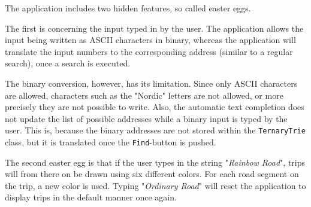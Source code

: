 The application includes two hidden features, so called easter eggs.

The first is concerning the input typed in by the user. The application allows the input being written as ASCII characters in binary, whereas the application will translate the input numbers to the corresponding address (similar to a regular search), once a search is executed.

The binary conversion, however, has its limitation. Since only ASCII characters are allowed, characters such as the "Nordic" letters are not allowed, or more precisely they are not possible to write. Also, the automatic text completion does not update the list of possible addresses while a binary input is typed by the user. This is, because the binary addresses are not stored within the \texttt{TernaryTrie} class, but it is translated once the \texttt{Find}-button is pushed.

The second easter egg is that if the user types in the string "\textit{Rainbow Road}", trips will from there on be drawn using six different colors. For each road segment on the trip, a new color is used. Typing "\textit{Ordinary Road}" will reset the application to display trips in the default manner once again.